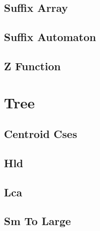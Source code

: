 \documentclass[9pt,portrait,twocolumn,a4paper,notitlepage]{article}
\newcommand\cppfile[2][]{%
\ifstrempty{#1}{}{}%
}
\begin{document}
\subsection{Suffix Array}
\cppfile{strings_clean/suffix_array.cpp}

\subsection{Suffix Automaton}
\cppfile{strings_clean/suffix_automaton.cpp}

\subsection{Z Function}
\cppfile{strings_clean/z_function.cpp}


\section{Tree}

\subsection{Centroid Cses}
\cppfile{tree_clean/centroid_cses.cpp}

\subsection{Hld}
\cppfile{tree_clean/hld.cpp}

\subsection{Lca}
\cppfile{tree_clean/LCA.cpp}

\subsection{Sm To Large}
\cppfile{tree_clean/sm_to_large.cpp}
\end{document}
